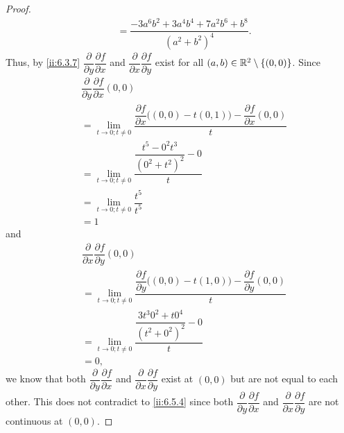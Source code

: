\begin{proof}
\begin{align*}
     & = \dfrac{-3 a^6 b^2 + 3 a^4 b^4 + 7 a^2 b^6 + b^8}{(a^2 + b^2)^4}.
  \end{align*}
  Thus, by \cref{ii:6.3.7} \(\dfrac{\partial}{\partial y} \dfrac{\partial f}{\partial x}\) and \(\dfrac{\partial}{\partial x} \dfrac{\partial f}{\partial y}\) exist for all \((a, b) \in \mathbb{R}^2 \setminus \left\lbrace(0, 0)\right\rbrace\).
  Since
  \begin{align*}
     & \dfrac{\partial}{\partial y} \dfrac{\partial f}{\partial x}(0, 0)                                                                      \\
     & = \lim_{t \to 0 ; t \neq 0} \dfrac{\dfrac{\partial f}{\partial x}\big((0, 0) - t(0, 1)\big) - \dfrac{\partial f}{\partial x}(0, 0)}{t} \\
     & = \lim_{t \to 0 ; t \neq 0} \dfrac{\dfrac{t^5 - 0^2 t^3}{(0^2 + t^2)^2} - 0}{t}                                                        \\
     & = \lim_{t \to 0 ; t \neq 0} \dfrac{t^5}{t^5}                                                                                           \\
     & = 1
  \end{align*}
  and
  \begin{align*}
     & \dfrac{\partial}{\partial x} \dfrac{\partial f}{\partial y}(0, 0)                                                                      \\
     & = \lim_{t \to 0 ; t \neq 0} \dfrac{\dfrac{\partial f}{\partial y}\big((0, 0) - t(1, 0)\big) - \dfrac{\partial f}{\partial y}(0, 0)}{t} \\
     & = \lim_{t \to 0 ; t \neq 0} \dfrac{\dfrac{3 t^3 0^2 + t 0^4}{(t^2 + 0^2)^2} - 0}{t}                                                    \\
     & = 0,
  \end{align*}
  we know that both \(\dfrac{\partial}{\partial y} \dfrac{\partial f}{\partial x}\) and \(\dfrac{\partial}{\partial x} \dfrac{\partial f}{\partial y}\) exist at \((0, 0)\) but are not equal to each other.
  This does not contradict to \cref{ii:6.5.4} since both \(\dfrac{\partial}{\partial y} \dfrac{\partial f}{\partial x}\) and \(\dfrac{\partial}{\partial x} \dfrac{\partial f}{\partial y}\) are not continuous at \((0, 0)\).
\end{proof}
